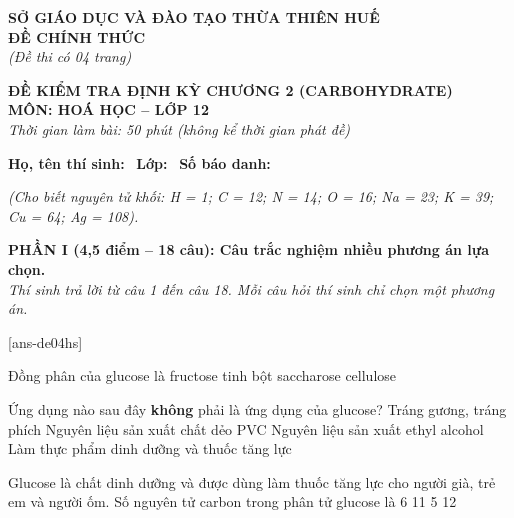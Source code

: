 \documentclass[12pt,a4paper]{article}
\begin{document}
\thispagestyle{firstpage}

\noindent
\begin{minipage}[t]{0.44\textwidth}
	\centering\fontsize{10pt}{12pt}\selectfont
	\textbf{SỞ GIÁO DỤC VÀ ĐÀO TẠO THỪA THIÊN HUẾ}\\
	\textbf{ĐỀ CHÍNH THỨC}\\
	\textit{(Đề thi có 04 trang)}
\end{minipage}\hfill
\begin{minipage}[t]{0.54\textwidth}
	\centering\small
	\textbf{ĐỀ KIỂM TRA ĐỊNH KỲ CHƯƠNG 2 (CARBOHYDRATE)}\\
	\textbf{MÔN: HOÁ HỌC -- LỚP 12}\\
	\textit{Thời gian làm bài: 50 phút (không kể thời gian phát đề)}\\
\end{minipage}

\smallskip
\noindent\hrulefill
\smallskip

\noindent\textbf{Họ, tên thí sinh:} \dotfill\ \textbf{Lớp:} \dotfill\ \textbf{Số báo danh:} \dotfill

\smallskip
\noindent\textit{(Cho biết nguyên tử khối: H = 1; C = 12; N = 14; O = 16; Na = 23; K = 39; Cu = 64; Ag = 108).}

\vspace{0.2cm}
\noindent
\textbf{PHẦN I (4,5 điểm -- 18 câu): Câu trắc nghiệm nhiều phương án lựa chọn.}\\
\textit{Thí sinh trả lời từ câu 1 đến câu 18. Mỗi câu hỏi thí sinh chỉ chọn một phương án.}

[ans-de04hs]

\begin{ex}
Đồng phân của glucose là
\choice
{fructose}
{tinh bột}
{saccharose}
{cellulose}
\loigiai{}
\end{ex}

\begin{ex}
Ứng dụng nào sau đây \textbf{không} phải là ứng dụng của glucose?
\choice
{Tráng gương, tráng phích}
{Nguyên liệu sản xuất chất dẻo PVC}
{Nguyên liệu sản xuất ethyl alcohol}
{Làm thực phẩm dinh dưỡng và thuốc tăng lực}
\loigiai{}
\end{ex}

\begin{ex}
Glucose là chất dinh dưỡng và được dùng làm thuốc tăng lực cho người già, trẻ em và người ốm. Số nguyên tử carbon trong phân tử glucose là
\choice
{6}
{11}
{5}
{12}
\loigiai{}
\end{ex}
\end{document}

